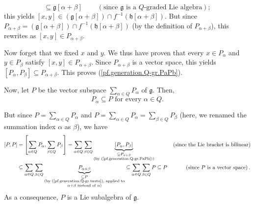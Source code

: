 \documentclass[etingof-lie.tex]{subfiles}
\begin{document}
\begin{verlong}
{\[\subseteq\mathfrak{g}\left[  \alpha+\beta\right]  \ \ \ \ \ \ \ \ \ \ \left(
\text{since }\mathfrak{g}\text{ is a }Q\text{-graded Lie algebra}\right)  ;
\]
this yields $\left[  x,y\right]  \in\left(  \mathfrak{g}\left[  \alpha
+\beta\right]  \right)  \cap f^{-1}\left(  \mathfrak{h}\left[  \alpha
+\beta\right]  \right)  $. But since $P_{\alpha+\beta}=\left(  \mathfrak{g}%
\left[  \alpha+\beta\right]  \right)  \cap f^{-1}\left(  \mathfrak{h}\left[
\alpha+\beta\right]  \right)  $ (by the definition of $P_{\alpha+\beta}$),
this rewrites as $\left[  x,y\right]  \in P_{\alpha+\beta}$.
\par
Now forget that we fixed $x$ and $y$. We thus have proven that every $x\in
P_{\alpha}$ and $y\in P_{\beta}$ satisfy $\left[  x,y\right]  \in
P_{\alpha+\beta}$. Since $P_{\alpha+\beta}$ is a vector space, this yields
$\left[  P_{\alpha},P_{\beta}\right]  \subseteq P_{\alpha+\beta}$. This proves
(\ref{pf.generation.Q-gr.PaPb}).}

Now, let $P$ be the vector subspace $\sum\limits_{\alpha\in Q}P_{\alpha}$ of
$\mathfrak{g}$. Then,%
\begin{equation}
P_{\alpha}\subseteq P\text{ for every }\alpha\in Q\text{.}
\label{pf.generation.Q-gr.tauto}%
\end{equation}


But since $P=\sum\limits_{\alpha\in Q}P_{\alpha}$ and $P=\sum\limits_{\alpha
\in Q}P_{\alpha}=\sum\limits_{\beta\in Q}P_{\beta}$ (here, we renamed the
summation index $\alpha$ as $\beta$), we have%
\begin{align*}
\left[  P,P\right]   &  =\left[  \sum\limits_{\alpha\in Q}P_{\alpha}%
,\sum\limits_{\beta\in Q}P_{\beta}\right]  =\sum\limits_{\alpha\in Q}%
\sum\limits_{\beta\in Q}\underbrace{\left[  P_{\alpha},P_{\beta}\right]
}_{\substack{\subseteq P_{\alpha+\beta}\\\text{(by
(\ref{pf.generation.Q-gr.PaPb}))}}}\ \ \ \ \ \ \ \ \ \ \left(  \text{since the
Lie bracket is bilinear}\right) \\
&  \subseteq\sum\limits_{\alpha\in Q}\sum\limits_{\beta\in Q}%
\underbrace{P_{\alpha+\beta}}_{\substack{\subseteq P\\\text{(by
(\ref{pf.generation.Q-gr.tauto}), applied to}\\\alpha+\beta\text{ instead of
}\alpha\text{)}}}\subseteq\sum\limits_{\alpha\in Q}\sum\limits_{\beta\in
Q}P\subseteq P\ \ \ \ \ \ \ \ \ \ \left(  \text{since }P\text{ is a vector
space}\right)  .
\end{align*}
As a consequence, $P$ is a Lie subalgebra of $\mathfrak{g}$.


\end{verlong}
\end{document}
